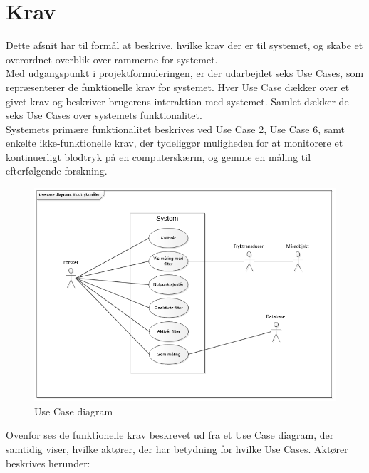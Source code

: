 \chapter{Krav}
Dette afsnit har til formål at beskrive, hvilke krav der er til systemet, og skabe et overordnet overblik over rammerne for systemet. \\
Med udgangspunkt i projektformuleringen, er der udarbejdet seks Use Cases, som repræsenterer de funktionelle krav for systemet. Hver Use Case dækker over et givet krav og beskriver brugerens interaktion med systemet. Samlet dækker de seks Use Cases over systemets funktionalitet.\\
Systemets primære funktionalitet beskrives ved Use Case 2, Use Case 6, samt enkelte ikke-funktionelle krav, der tydeliggør muligheden for at monitorere et kontinuerligt blodtryk på en computerskærm, og gemme en måling til efterfølgende forskning.

\begin{figure}[H]
	\centering
	\includegraphics[width=1\textwidth]{Figurer/1}
	\caption{Use Case diagram}
\end{figure}

Ovenfor ses de funktionelle krav beskrevet ud fra et Use Case diagram, der samtidig viser, hvilke aktører, der har betydning for hvilke Use Cases.  Aktører beskrives herunder:
\\\\

